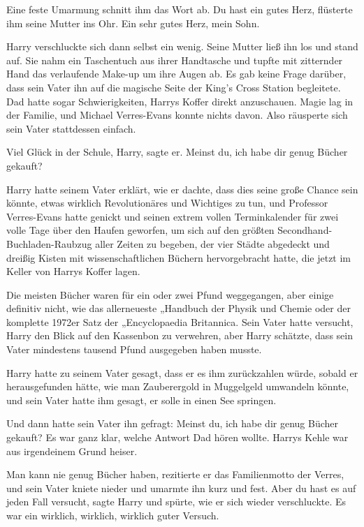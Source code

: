Eine feste Umarmung schnitt ihm das Wort ab. \glqq{}Du hast ein gutes
Herz\grqq{}, flüsterte ihm seine Mutter ins Ohr. \glqq{}Ein sehr gutes Herz, mein
Sohn.\grqq{}

Harry verschluckte sich dann selbst ein wenig. Seine Mutter ließ ihn los und
stand auf. Sie nahm ein Taschentuch aus ihrer Handtasche und tupfte mit
zitternder Hand das verlaufende Make-up um ihre Augen ab. Es gab keine Frage
darüber, dass sein Vater ihn auf die magische Seite der King's Cross Station
begleitete. Dad hatte sogar Schwierigkeiten, Harrys Koffer direkt anzuschauen.
Magie lag in der Familie, und Michael Verres-Evans konnte nichts davon. Also
räusperte sich sein Vater stattdessen einfach.

\glqq{}Viel Glück in der Schule, Harry\grqq{}, sagte er. \glqq{}Meinst du, ich
habe dir genug Bücher gekauft?\grqq{}

Harry hatte seinem Vater erklärt, wie er dachte, dass dies seine große Chance
sein könnte, etwas wirklich Revolutionäres und Wichtiges zu tun, und Professor
Verres-Evans hatte genickt und seinen extrem vollen Terminkalender für zwei
volle Tage über den Haufen geworfen, um sich auf den größten
Secondhand-Buchladen-Raubzug aller Zeiten zu begeben, der vier Städte abgedeckt
und dreißig Kisten mit wissenschaftlichen Büchern hervorgebracht hatte, die
jetzt im Keller von Harrys Koffer lagen.

Die meisten Bücher waren für ein oder zwei Pfund weggegangen, aber einige
definitiv nicht, wie das allerneueste „Handbuch der Physik und Chemie\grqq{}
oder der komplette 1972er Satz der „Encyclopaedia Britannica\grqq{}. Sein Vater
hatte versucht, Harry den Blick auf den Kassenbon zu verwehren, aber Harry
schätzte, dass sein Vater mindestens tausend Pfund ausgegeben haben musste.

Harry hatte zu seinem Vater gesagt, dass er es ihm zurückzahlen würde, sobald er
herausgefunden hätte, wie man Zauberergold in Muggelgeld umwandeln könnte, und
sein Vater hatte ihm gesagt, er solle in einen See springen.

Und dann hatte sein Vater ihn gefragt: Meinst du, ich habe dir genug Bücher
gekauft? Es war ganz klar, welche Antwort Dad hören wollte. Harrys Kehle war aus
irgendeinem Grund heiser.

\glqq{}Man kann nie genug Bücher haben\grqq{}, rezitierte er das Familienmotto
der Verres, und sein Vater kniete nieder und umarmte ihn kurz und fest. \glqq
Aber du hast es auf jeden Fall versucht\grqq{}, sagte Harry und spürte, wie er
sich wieder verschluckte. \glqq{}Es war ein wirklich, wirklich, wirklich guter
Versuch.\grqq{}

